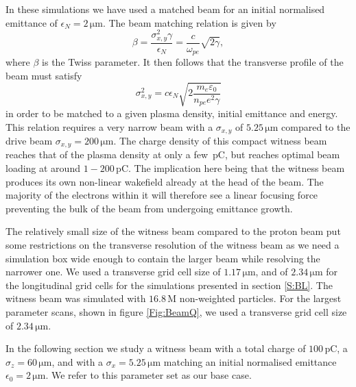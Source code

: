 \documentclass[aps,prstab,reprint,amsmath,amssymb,groupedaddress]{revtex4-1}
\newcommand{\unit}[1]{\,\mathrm{#1}}
\begin{document}
In these simulations we have used a matched beam for an initial normalised emittance of $\epsilon_{N} = 2\unit{\mu m}$.
The beam matching relation is given by
\begin{equation}
    \beta = \frac{\sigma_{x,y}^{2}\gamma}{\epsilon_{N}}
          = \frac{c}{\omega_{pe}}\sqrt{2\gamma}, \label{EQ:MatchedB}
\end{equation}
where $\beta$ is the Twiss parameter. It then follows that the transverse profile of the beam must satisfy
\begin{equation}
    \sigma_{x,y}^{2} = c\epsilon_{N}\sqrt{2\frac{m_{e}\varepsilon_{0}}{n_{pe}e^{2}\gamma}} \label{EQ:MatchedR}
\end{equation}
in order to be matched to a given plasma density, initial emittance and energy. This relation requires a very narrow
beam with a $\sigma_{x,y}$ of $5.25\unit{\mu m}$ compared to the drive beam $\sigma_{x,y} = 200\unit{\mu m}$. The charge
density of this compact witness beam reaches that of the plasma density at only a few $\unit{pC}$, but reaches optimal
beam loading at around $1-200\unit{pC}$. The implication here being that the witness beam produces its own non-linear
wakefield already at the head of the beam. The majority of the electrons within it will therefore see a linear focusing
force preventing the bulk of the beam from undergoing emittance growth.

The relatively small size of the witness beam compared to the proton beam put some restrictions on the transverse
resolution of the witness beam as we need a simulation box wide enough to contain the larger beam while resolving the
narrower one. We used a transverse grid cell size of $1.17\unit{\mu m}$, and of $2.34\unit{\mu m}$ for the longitudinal
grid cells  for the simulations presented in section \ref{S:BL}. The witness beam was simulated with $16.8\unit{M}$
non-weighted particles. For the largest parameter scans, shown in figure \ref{Fig:BeamQ}, we used a transverse grid cell
size of $2.34\unit{\mu m}$.

In the following section we study a witness beam with a total charge of $100\unit{pC}$, a $\sigma_{z}=60\unit{\mu m}$,
and with a $\sigma_{x}=5.25\unit{\mu m}$ matching an initial normalised emittance $\epsilon_{0} = 2\unit{\mu m}$. We
refer to this parameter set as our base case.

\end{document}
